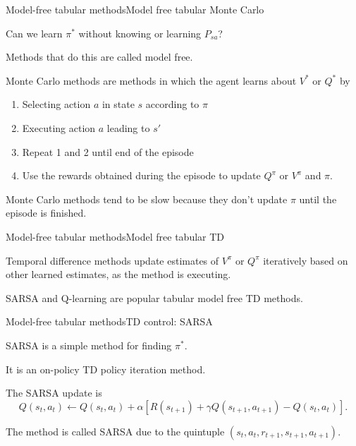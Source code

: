 \documentclass{beamer}
\begin{document}
\begin{frame}{Model-free tabular methods}{Model free tabular Monte Carlo}

  Can we learn $\pi^*$ without knowing or learning $P_{sa}$?

  \medskip

  Methods that do this are called \alert{model free}.

  \medskip

  Monte Carlo methods are methods in which the agent learns
  about $V^*$ or $Q^*$ by

  \begin{enumerate}
  \item Selecting action $a$ in state $s$ according to $\pi$
  \item Executing action $a$ leading to $s'$
  \item Repeat 1 and 2 until end of the episode
  \item Use the rewards obtained during the episode to update
        $Q^\pi$ or $V^\pi$ and $\pi$.
  \end{enumerate}

  Monte Carlo methods tend to be slow because they don't update
  $\pi$ until the episode is finished.

\end{frame}


\begin{frame}{Model-free tabular methods}{Model free tabular TD}

  \alert{Temporal difference} methods update estimates of
  $V^\pi$ or $Q^\pi$ iteratively based on other learned estimates,
  \alert{as the method is executing}.

  \medskip

  SARSA and Q-learning are popular tabular model free TD methods.

\end{frame}


\begin{frame}{Model-free tabular methods}{TD control: SARSA}

  SARSA is a simple method for finding $\pi^*$.

  \medskip

  It is an \alert{on-policy} TD policy iteration method.

  \medskip

  The SARSA update is
  $$Q(s_t,a_t) \leftarrow Q(s_t,a_t) + \alpha\left[ R(s_{t+1}) + \gamma
    Q(s_{t+1},a_{t+1}) - Q(s_t,a_t) \right]. $$

  The method is called SARSA due to the quintuple $(s_t, a_t, r_{t+1},
  s_{t+1}, a_{t+1})$.
  
\end{frame}
\end{document}
